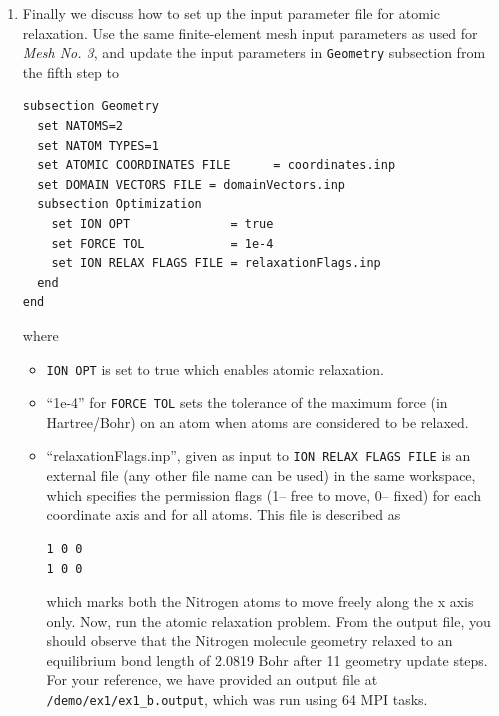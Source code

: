 \begin{enumerate}
\item Finally we discuss how to set up the input parameter file for atomic relaxation. 
Use the same finite-element mesh input parameters as used for \emph{Mesh No. 3}, and update the 
input parameters in \verb|Geometry| subsection from the fifth step to
\begin{verbatim}
subsection Geometry
  set NATOMS=2
  set NATOM TYPES=1
  set ATOMIC COORDINATES FILE      = coordinates.inp 
  set DOMAIN VECTORS FILE = domainVectors.inp
  subsection Optimization
    set ION OPT              = true
    set FORCE TOL            = 1e-4    
    set ION RELAX FLAGS FILE = relaxationFlags.inp
  end
end
\end{verbatim}
where
\begin{itemize}
\item \verb|ION OPT| is set to true which enables atomic relaxation.  		
\item ``1e-4'' for \verb|FORCE TOL| sets the tolerance of the maximum force (in Hartree/Bohr) on an atom when atoms are
considered to be relaxed.
\item ``relaxationFlags.inp'', given as input to \verb|ION RELAX FLAGS FILE| is an external file (any other file name can be used) in the same workspace, which specifies the permission flags (1-- free to move, 0-- fixed) for each coordinate axis and for all atoms. This file is described as 
\begin{verbatim}
1 0 0
1 0 0
\end{verbatim}
which marks both the Nitrogen atoms to move freely along the x axis only.
Now, run the atomic relaxation problem. From the output file, you should observe that the Nitrogen molecule geometry relaxed to
an equilibrium bond length of 2.0819 Bohr after 11 geometry update steps.  For your reference, we have provided an output file at \verb|/demo/ex1/ex1_b.output|, which was run using 64 MPI tasks.
\end{itemize}
\end{enumerate}

